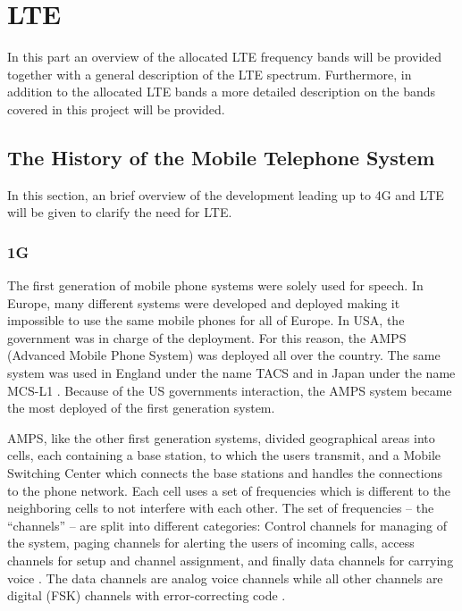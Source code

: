 \section{LTE}
\label{sec:lte}
In this part an overview of the allocated LTE frequency bands will be provided together with a general description of the LTE spectrum.
Furthermore, in addition to the allocated LTE bands a more detailed description on the bands covered in this project will be provided.

\subsection{The History of the Mobile Telephone System}
In this section, an brief overview of the development leading up to 4G and LTE will be given to clarify the need for LTE.

\subsubsection{1G}
The first generation of mobile phone systems were solely used for speech. In Europe, many different systems were developed and deployed \cite{ramjee1998universal} making it impossible to use the same mobile phones for all of Europe. In USA, the government was in charge of the deployment. For this reason, the AMPS (Advanced Mobile Phone System) was deployed all over the country. The same system was used in England under the name TACS and in Japan under the name MCS-L1 \cite{tanenbaum2012computer}. Because of the US governments interaction, the AMPS system became the most deployed of the first generation system.

AMPS, like the other first generation systems, divided geographical areas into cells, each containing a base station, to which the users transmit, and a Mobile Switching Center which connects the base stations and handles the connections to the phone network. Each cell uses a set of frequencies which is different to the neighboring cells to not interfere with each other. The set of frequencies -- the ``channels'' -- are split into different categories: Control channels for managing of the system, paging channels for alerting the users of incoming calls, access channels for setup and channel assignment, and finally data channels for carrying voice \cite{tanenbaum2012computer}. The data channels are analog voice channels while all other channels are digital (FSK) channels with error-correcting code \cite{tanenbaum2012computer}.

